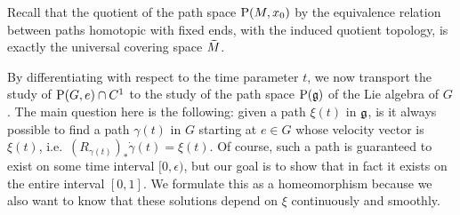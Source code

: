 Recall that the quotient of the path space $\mathrm{P}(M,x_0)$ by the equivalence relation between paths homotopic with fixed ends, with the induced quotient topology, is exactly the universal covering space $\wt{M}$.


By differentiating with respect to the time parameter $t$, we now transport the study of $\mathrm{P}(G,e)\cap C^1$ to the study of the path space $\mathrm{P}(\mathfrak{g})$ of the Lie algebra of $G$. The main question here is the following: given a path $\xi(t)$ in $\mathfrak{g}$, is it always possible to find a path $\gamma(t)$ in $G$ starting at $e\in G$ whose velocity vector is $\xi(t)$, i.e.~$\left(R_{\gamma(t)}\right)_{\ast}\dot\gamma(t)=\xi(t)$. Of course, such a path is guaranteed to exist on some time interval $[0,\epsilon)$, but our goal is to show that in fact it exists on the entire interval $[0,1]$. We formulate this as a homeomorphism because we also want to know that these solutions depend on $\xi$ continuously and smoothly.


